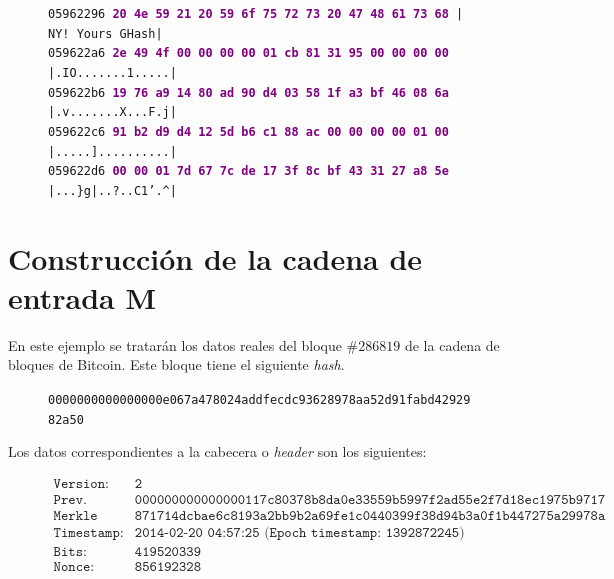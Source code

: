 \documentclass{article}
\begin{document}
\begin{figure}[H]
{    \texttt{05962296  \textbf{\textcolor{purple}{20 4e 59 21 20 59 6f 75  72 73 20 47 48 61 73 68}}  | NY! Yours GHash|} \\
    \texttt{059622a6  \textbf{\textcolor{purple}{2e 49 4f 00 00 00 00 01  cb 81 31 95 00 00 00 00}}  |.IO.......1.....|} \\
    \texttt{059622b6  \textbf{\textcolor{purple}{19 76 a9 14 80 ad 90 d4  03 58 1f a3 bf 46 08 6a}}  |.v.......X...F.j|} \\
    \texttt{059622c6  \textbf{\textcolor{purple}{91 b2 d9 d4 12 5d b6 c1  88 ac 00 00 00 00 01 00}}  |.....]..........|} \\
    \texttt{059622d6  \textbf{\textcolor{purple}{00 00 01 7d 67 7c de 17  3f 8c bf 43 31 27 a8 5e}}  |...\}g|..?..C1'.\textasciicircum|}
    }
    \end{figure}
    
\section{Construcción de la cadena de entrada M}
    En este ejemplo se tratarán los datos reales del bloque $\#286819$ de la cadena de bloques de Bitcoin. Este bloque tiene el siguiente \textit{hash}.
    
    \begin{figure}[H]
        \centering
        \scriptsize{
        \texttt{0000000000000000e067a478024addfecdc93628978aa52d91fabd4292982a50}
        }
    \end{figure}
    
    Los datos correspondientes a la cabecera o \textit{header} son los siguientes:
    \begin{figure}[H]
    \centering
    \scriptsize{
        $\begin{array}{ll}
            \texttt{Version:} & \texttt{2} \\
            \texttt{Prev. Block:} & \texttt{000000000000000117c80378b8da0e33559b5997f2ad55e2f7d18ec1975b9717} \\
            \texttt{Merkle root:} & \texttt{871714dcbae6c8193a2bb9b2a69fe1c0440399f38d94b3a0f1b447275a29978a} \\
            \texttt{Timestamp:} & \texttt{2014-02-20 04:57:25 (Epoch timestamp: 1392872245)} \\
            \texttt{Bits:} & \texttt{419520339} \\
            \texttt{Nonce:} & \texttt{856192328} \\
        \end{array}$
    }
    \end{figure}
    
\end{document}
